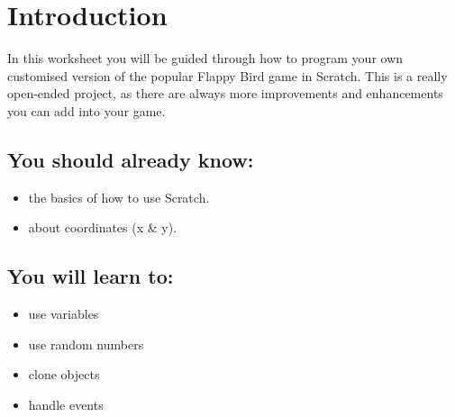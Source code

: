 \section{Introduction}
In this worksheet you will be guided through how to program your own customised version of the popular Flappy Bird game in Scratch.
This is a really open-ended project, as there are always more improvements and enhancements you can add into your game.

\subsection{You should already know:}
\begin{itemize}
    \item the basics of how to use Scratch.
    \item about coordinates (x \& y).
\end{itemize}

\subsection{You will learn to:}
\begin{itemize}
    \item use variables
    \item use random numbers
    \item clone objects
    \item handle events
\end{itemize}